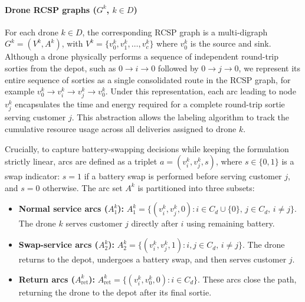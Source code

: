 \documentclass[3p, authoryear, 11pt]{elsarticle}
\begin{document}
\paragraph{Drone RCSP graphs ($G^k$, $k\in D$)}
For each drone $k\in D$, the corresponding RCSP graph is a multi-digraph $G^k=(V^k,A^k)$, with $V^k=\{v_0^k,v_1^k,\ldots,v_c^k\}$ where $v_0^k$ is the source and sink. Although a drone physically performs a sequence of independent round-trip sorties from the depot, such as $0\to i\to 0$ followed by $0\to j\to 0$, we represent its entire sequence of sorties as a single consolidated route in the RCSP graph, for example $v_0^k\to v_i^k\to v_j^k\to v_0^k$. Under this representation, each arc leading to node $v_j^k$ encapsulates the time and energy required for a complete round-trip sortie serving customer $j$. This abstraction allows the labeling algorithm to track the cumulative resource usage across all deliveries assigned to drone $k$.

Crucially, to capture battery-swapping decisions while keeping the formulation strictly linear, arcs are defined as a triplet
$a=(v_i^k,v_j^k,s)$, where $s\in\{0,1\}$ is a swap indicator: $s=1$ if a battery swap is performed before serving customer $j$, and $s=0$ otherwise. The arc set $A^k$ is partitioned into three subsets:

\begin{itemize}
    \item \textbf{Normal service arcs ($A_1^k$):} 
    $
    A_1^k =
    \{(v_i^k,v_j^k,0):
    i\in C_d\cup\{0\},\,
    j\in C_d,\,
    i\neq j\}
    $. The drone $k$ serves customer $j$ directly after $i$ using remaining battery.

    \item \textbf{Swap-service arcs ($A_2^k$):}
    $
    A_2^k =
    \{(v_i^k,v_j^k,1):
    i,j\in C_d,\,
    i\neq j\}
    $. The drone returns to the depot, undergoes a battery swap, and then serves customer $j$.

    \item \textbf{Return arcs ($A_{\mathrm{ret}}^k$):}
    $
    A_{\mathrm{ret}}^k =
    \{(v_i^k,v_0^k,0):
    i\in C_d\}
    $. These arcs close the path, returning the drone to the depot after its final sortie.
\end{itemize}
\end{document}
